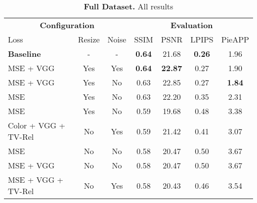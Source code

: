 \begin{table}[ht]
    \scriptsize
    \centering
    \setlength{\tabcolsep}{0.3em}
    \caption{\textbf{Full Dataset.} All results}
    \begin{tabular}{lcc|cccc}
        \toprule
        \multicolumn{3}{c}{\textbf{Configuration}} & \multicolumn{4}{c}{\textbf{Evaluation}} \\
        Loss & Resize & Noise & SSIM & PSNR & LPIPS & PieAPP \\
        \midrule
        \textbf{Baseline} & - & - & \textbf{0.64} & 21.68 & \textbf{0.26} & 1.96 \\
        \hline
        MSE + VGG & Yes & Yes & \textbf{0.64} & \textbf{22.87} & 0.27 & 1.90 \\
        MSE + VGG & Yes & No & 0.63 & 22.85 & 0.27 & \textbf{1.84} \\
        MSE & Yes & No & 0.63 & 22.20 & 0.35 & 2.31 \\
        MSE & Yes & No & 0.59 & 19.68 & 0.48 & 3.38 \\
        Color + VGG + TV-Rel & No & Yes & 0.59 & 21.42 & 0.41 & 3.07 \\
        MSE & No & No & 0.58 & 20.47 & 0.50 & 3.67 \\
        MSE + VGG & No & No & 0.58 & 20.47 & 0.50 & 3.67 \\
        MSE + VGG + TV-Rel & No & Yes & 0.58 & 20.43 & 0.46 & 3.54 \\
        \bottomrule
    \end{tabular}
    \label{tab:all-full-dataset-results}
\end{table}


